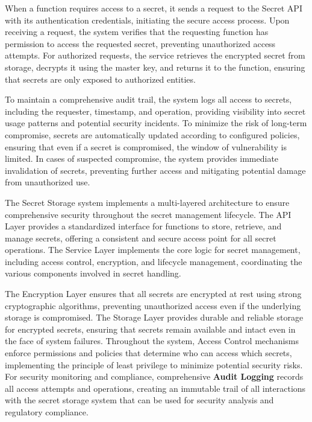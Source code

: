 \documentclass[11pt]{article}
\begin{document}
When a function requires access to a secret, it sends a request to the Secret API with its authentication credentials, initiating the secure access process. Upon receiving a request, the system verifies that the requesting function has permission to access the requested secret, preventing unauthorized access attempts. For authorized requests, the service retrieves the encrypted secret from storage, decrypts it using the master key, and returns it to the function, ensuring that secrets are only exposed to authorized entities.

To maintain a comprehensive audit trail, the system logs all access to secrets, including the requester, timestamp, and operation, providing visibility into secret usage patterns and potential security incidents. To minimize the risk of long-term compromise, secrets are automatically updated according to configured policies, ensuring that even if a secret is compromised, the window of vulnerability is limited. In cases of suspected compromise, the system provides immediate invalidation of secrets, preventing further access and mitigating potential damage from unauthorized use.

The Secret Storage system implements a multi-layered architecture to ensure comprehensive security throughout the secret management lifecycle. The API Layer provides a standardized interface for functions to store, retrieve, and manage secrets, offering a consistent and secure access point for all secret operations. The Service Layer implements the core logic for secret management, including access control, encryption, and lifecycle management, coordinating the various components involved in secret handling.

The Encryption Layer ensures that all secrets are encrypted at rest using strong cryptographic algorithms, preventing unauthorized access even if the underlying storage is compromised. The Storage Layer provides durable and reliable storage for encrypted secrets, ensuring that secrets remain available and intact even in the face of system failures. Throughout the system, Access Control mechanisms enforce permissions and policies that determine who can access which secrets, implementing the principle of least privilege to minimize potential security risks. For security monitoring and compliance, comprehensive \textbf{Audit Logging} records all access attempts and operations, creating an immutable trail of all interactions with the secret storage system that can be used for security analysis and regulatory compliance.
\end{document}
